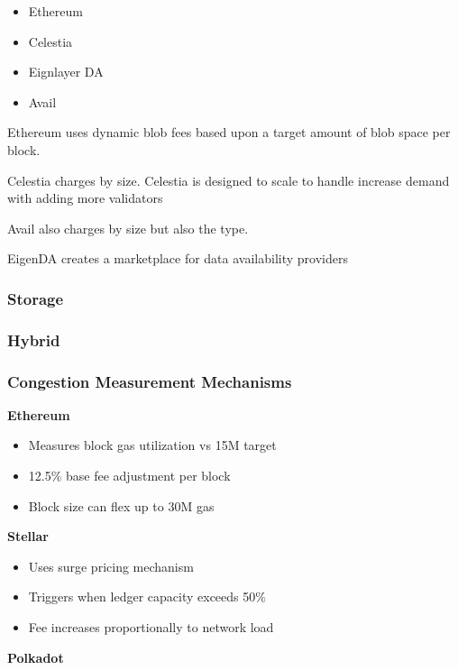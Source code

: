 \documentclass[
  letterpaper,
  DIV=11,
  numbers=noendperiod]{scrreprt}
\providecommand{\tightlist}{%
  \setlength{\itemsep}{0pt}\setlength{\parskip}{0pt}}\usepackage{longtable,booktabs,array}
\begin{document}
\begin{itemize}
\tightlist
\item
  Ethereum
\item
  Celestia
\item
  Eignlayer DA
\item
  Avail
\end{itemize}

Ethereum uses dynamic blob fees based upon a target amount of blob space
per block.

Celestia charges by size. Celestia is designed to scale to handle
increase demand with adding more validators

Avail also charges by size but also the type.

EigenDA creates a marketplace for data availability providers

\subsubsection{Storage}\label{storage}

\subsubsection{Hybrid}\label{hybrid}

\subsubsection{Congestion Measurement
Mechanisms}\label{congestion-measurement-mechanisms}

\textbf{Ethereum}

\begin{itemize}
\tightlist
\item
  Measures block gas utilization vs 15M target
\item
  12.5\% base fee adjustment per block
\item
  Block size can flex up to 30M gas
\end{itemize}

\textbf{Stellar}

\begin{itemize}
\tightlist
\item
  Uses surge pricing mechanism
\item
  Triggers when ledger capacity exceeds 50\%
\item
  Fee increases proportionally to network load
\end{itemize}

\textbf{Polkadot}
\end{document}
